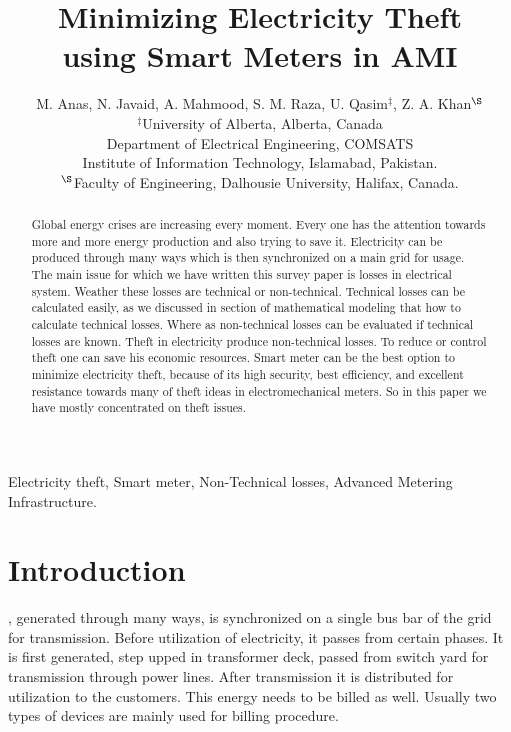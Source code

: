\documentclass[10pt, conference, compsocconf]{IEEEtran}
\begin{document}
\title{Minimizing Electricity Theft\\ using Smart Meters in AMI}

\author{M. Anas, N. Javaid, A. Mahmood, S. M. Raza, U. Qasim$^{\ddag}$, Z. A. Khan$^{\S}$\\

        $^{\ddag}$University of Alberta, Alberta, Canada\\
        Department of Electrical Engineering, COMSATS\\ Institute of
        Information Technology, Islamabad, Pakistan. \\
        $^{\S}$Faculty of Engineering, Dalhousie University, Halifax, Canada.
        }

\maketitle


\begin{abstract}
Global energy crises are increasing every moment. Every one has the attention towards more and more energy production and also trying to save it. Electricity can be produced through many ways which is then synchronized on a main grid for usage. The main issue for which we have written this survey paper is losses in electrical system. Weather these losses are technical or non-technical. Technical losses can be calculated easily, as we discussed in section of mathematical modeling that how to calculate technical losses. Where as non-technical losses can be evaluated if technical losses are known. Theft in electricity produce non-technical losses. To reduce or control theft one can save his economic resources. Smart meter can be the best option to minimize electricity theft, because of its high security, best efficiency, and excellent resistance towards many of theft ideas in electromechanical meters. So in this paper we have mostly concentrated on theft issues.
\end{abstract}

\begin{IEEEkeywords}
Electricity theft, Smart meter, Non-Technical losses, Advanced Metering Infrastructure.
\end{IEEEkeywords}


\section{Introduction}
, generated through many ways, is synchronized on a single bus bar of the grid for transmission. Before utilization of electricity, it passes from certain phases. It is first generated, step upped in transformer deck, passed from switch yard for transmission through power lines. After transmission it is distributed for utilization to the customers. This energy needs to be billed as well. Usually two types of devices are mainly used for billing procedure.
\end{document}
